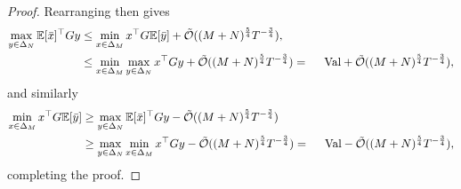 \begin{proof}
Rearranging then gives
\begin{align*}
\max_{y\in\Delta_N} \mathbb{E}[\bar{x}]^\top Gy 
&\leq \min_{x \in \Delta_M} x^\top G \mathbb{E}[\bar{y}]  + \tilde{\mathcal{O}}((M+N)^{\frac{5}{4}}T^{-\frac{3}{4}}), \\
&\leq \min_{x\in \Delta_M}\max_{y\in \Delta_N} x^\top Gy + \tilde{\mathcal{O}}((M+N)^{\frac{5}{4}}T^{-\frac{3}{4}})
= \text{\rm Val} + \tilde{\mathcal{O}}((M+N)^{\frac{5}{4}}T^{-\frac{3}{4}}), 
\end{align*}
and similarly
\begin{align*}
\min_{x\in \Delta_M} x^\top G\mathbb{E}[\bar{y}]
&\geq \max_{y\in\Delta_N} \mathbb{E}[\bar{x}]^\top Gy - \tilde{\mathcal{O}}((M+N)^{\frac{5}{4}}T^{-\frac{3}{4}}) \\
&\geq \max_{y\in \Delta_N}\min_{x\in \Delta_M}x^\top Gy - \tilde{\mathcal{O}}((M+N)^{\frac{5}{4}}T^{-\frac{3}{4}})
= \text{\rm Val} - \tilde{\mathcal{O}}((M+N)^{\frac{5}{4}}T^{-\frac{3}{4}}), 
\end{align*}
completing the proof.
\end{proof}


